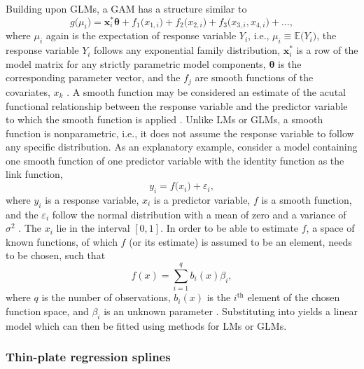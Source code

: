 Building upon GLMs, a GAM has a structure similar to
\begin{equation}
  \label{eq:GAM}
  g\bigl(\mu_i\bigr) = \symbf{x}_i^* \symbf{\theta} + f_{1}\bigl(x_{1, i}\bigr) + f_{2}\bigl(x_{2, i}\bigr) + f_{3}\bigl(x_{3, i}, x_{4, i}\bigr) + \ldots,
\end{equation}
where \(\mu_i\) again is the expectation of response variable \(Y_i\), i.e., \(\mu_i \equiv \mathbb{E}\bigl(Y_i\bigr)\), the response variable \(Y_i\) follows any exponential family distribution, \(\symbf{x}_i^*\) is a row of the model matrix for any strictly parametric model components, \(\symbf{\theta}\) is the corresponding parameter vector, and the \(f_j\) are smooth functions of the covariates, \(x_k\) \parencite{Wood2006}.  A smooth function may be considered an estimate of the acutal functional relationship between the response variable and the predictor variable to which the smooth function is applied \parencite{Hastie1991}.  Unlike LMs or GLMs, a smooth function is nonparametric, i.e., it does not assume the response variable to follow any specific distribution.
As an explanatory example, consider a model containing one smooth function of one predictor variable with the identity function as the link function,
\begin{equation}
  \label{eq:GAMSimple}
  y_i = f\bigl(x_i\bigr) + \varepsilon_i,
\end{equation}
where \(y_i\) is a response variable, \(x_i\) is a predictor variable, \(f\) is a smooth function, and the \(\varepsilon_i\) follow the normal distribution with a mean of zero and a variance of \(\sigma^2\) \parencite{Wood2006}.  The \(x_i\) lie in the interval \([0, 1]\).  In order to be able to estimate \(f\), a space of known functions, of which \(f\) (or its estimate) is assumed to be an element, needs to be chosen, such that
\begin{equation}
  \label{eq:SmoothFunctionBasis}
  f(x) = \sum_{i = 1}^q b_i(x)\beta_i,
\end{equation}
where \(q\) is the number of observations, \(b_i(x)\) is the \(i^{\text{th}}\) element of the chosen function space, and \(\beta_i\) is an unknown parameter \parencite{Wood2006}.  Substituting  into  yields a linear model which can then be fitted using methods for LMs or GLMs.

\subsubsection{Thin-plate regression splines}

